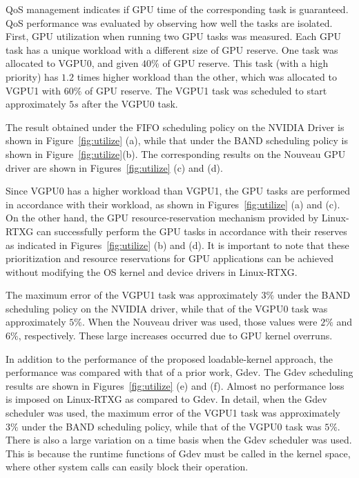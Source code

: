 QoS management indicates if GPU time of the corresponding task is guaranteed.
QoS performance was evaluated by observing how well the tasks are isolated.
First, GPU utilization when running two GPU tasks was measured.
Each GPU task has a unique workload with a different size of GPU reserve.
One task was allocated to VGPU0, and given $40\%$ of GPU reserve.
This task (with a high priority) has $1.2$ times higher workload than the other, which was allocated to VGPU1 with $60\%$ of GPU reserve.
The VGPU1 task was scheduled to start approximately $5s$ after the VGPU0 task.


The result obtained under the FIFO scheduling policy on the NVIDIA Driver is shown in Figure~\ref{fig:utilize} (a), while that under the BAND scheduling policy is shown in Figure~\ref{fig:utilize}(b).
The corresponding results on the Nouveau GPU driver are shown in Figures~\ref{fig:utilize} (c) and (d).


Since VGPU0 has a higher workload than VGPU1, the GPU tasks are performed in accordance with their workload, as shown in Figures~\ref{fig:utilize} (a) and (c).
On the other hand, the GPU resource-reservation mechanism provided by Linux-RTXG can successfully perform the GPU tasks in accordance with their reserves as indicated in Figures~\ref{fig:utilize} (b) and (d).
It is important to note that these prioritization and resource reservations for GPU applications can be achieved without modifying the OS kernel and device drivers in Linux-RTXG.


The maximum error of the VGPU1 task was approximately $3\%$ under the BAND scheduling policy on the NVIDIA driver, while that of the VGPU0 task was approximately $5\%$.
When the Nouveau driver was used, those values were $2\%$ and $6\%$, respectively.
These large increases occurred due to GPU kernel overruns.


In addition to the performance of the proposed loadable-kernel approach, the performance was compared with that of a prior work, Gdev.
The Gdev scheduling results are shown in Figures~\ref{fig:utilize} (e) and (f).
Almost no performance loss is imposed on Linux-RTXG as compared to Gdev.
In detail, when the Gdev scheduler was used, the maximum error of the VGPU1 task was approximately $3\%$ under the BAND scheduling policy, while that of the VGPU0 task was $5\%$.
There is also a large variation on a time basis when the Gdev scheduler was used.
This is because the runtime functions of Gdev must be called in the kernel space, where other system calls can easily block their operation.


